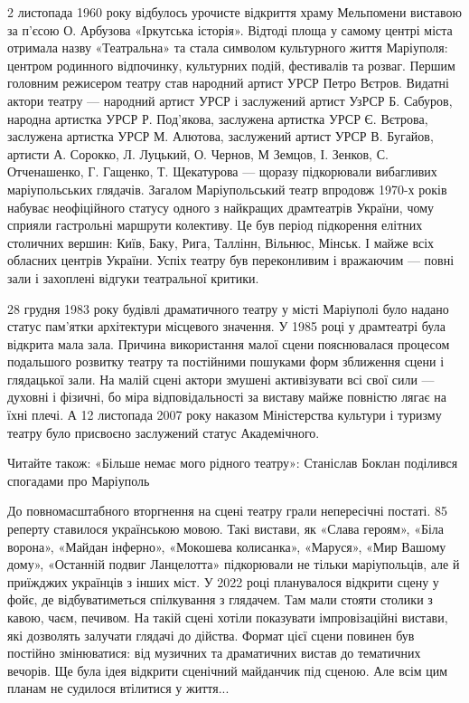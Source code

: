2 листопада 1960 року відбулось урочисте відкриття храму Мельпомени виставою за
п'єсою О. Арбузова «Іркутська історія». Відтоді площа у самому центрі міста
отримала назву «Театральна» та стала символом культурного життя Маріуполя:
центром родинного відпочинку, культурних подій, фестивалів та розваг. Першим
головним режисером театру став народний артист УРСР Петро Вєтров. Видатні
актори театру — народний артист УРСР і заслужений артист УзРСР Б. Сабуров,
народна артистка УРСР Р. Под'якова, заслужена артистка УРСР Є. Вєтрова,
заслужена артистка УРСР М. Алютова, заслужений артист УРСР В. Бугайов, артисти
А. Сорокко, Л. Луцький, О. Чернов, М Земцов, І. Зенков, С. Отченашенко, Г.
Гащенко, Т. Щекатурова — щоразу підкорювали вибагливих маріупольських глядачів.
Загалом Маріупольський театр впродовж 1970-х років набуває неофіційного статусу
одного з найкращих драмтеатрів України, чому сприяли гастрольні маршрути
колективу. Це був період підкорення елітних столичних вершин: Київ, Баку, Рига,
Таллінн, Вільнюс, Мінськ. І майже всіх обласних центрів України. Успіх театру
був переконливим і вражаючим — повні зали і захоплені відгуки театральної
критики.

28 грудня 1983 року будівлі драматичного театру у місті Маріуполі було надано
статус пам'ятки архітектури місцевого значення. У 1985 році у драмтеатрі була
відкрита мала зала. Причина використання малої сцени пояснювалася процесом
подальшого розвитку театру та постійними пошуками форм зближення сцени і
глядацької зали. На малій сцені актори змушені активізувати всі свої сили —
духовні і фізичні, бо міра відповідальності за виставу майже повністю лягає на
їхні плечі. А 12 листопада 2007 року наказом Міністерства культури і туризму
театру було присвоєно заслужений статус Академічного.

Читайте також: «Більше немає мого рідного театру»: Станіслав Боклан поділився
спогадами про Маріуполь

До повномасштабного вторгнення на сцені театру грали непересічні постаті. 85%
реперту ставилося українською мовою. Такі вистави, як «Слава героям», «Біла
ворона», «Майдан інферно», «Мокошева колисанка», «Маруся», «Мир Вашому дому»,
«Останній подвиг Ланцелотта» підкорювали не тільки маріупольців, але й
приїжджих українців з інших міст. У 2022 році планувалося відкрити сцену у
фойє, де відбуватиметься спілкування з глядачем. Там мали стояти столики з
кавою, чаєм, печивом. На такій сцені хотіли показувати імпровізаційні вистави,
які дозволять залучати глядачі до дійства. Формат цієї сцени повинен був
постійно змінюватися: від музичних та драматичних вистав до тематичних вечорів.
Ще була ідея відкрити сценічний майданчик під сценою. Але всім цим планам не
судилося втілитися у життя...

